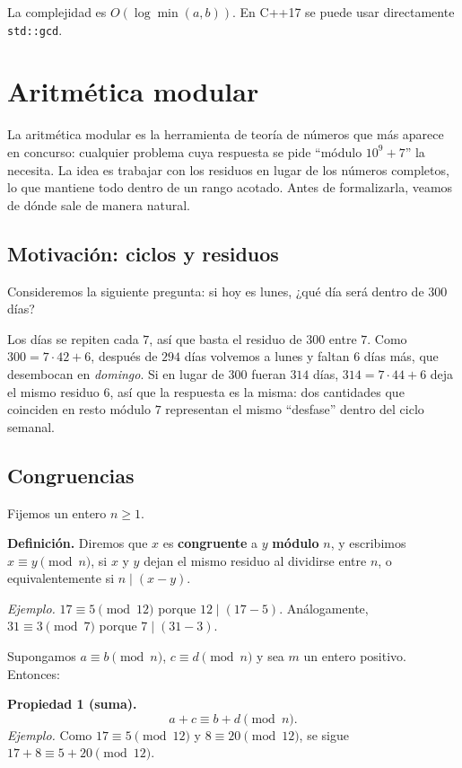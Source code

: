 La complejidad es $O(\log \min(a,b))$. En C++17 se puede usar directamente \texttt{std::gcd}.

\section{Aritmética modular}

La aritmética modular es la herramienta de teoría de números que más aparece en concurso: cualquier problema cuya respuesta se pide ``módulo $10^9+7$'' la necesita. La idea es trabajar con los residuos en lugar de los números completos, lo que mantiene todo dentro de un rango acotado. Antes de formalizarla, veamos de dónde sale de manera natural.

\subsection*{Motivación: ciclos y residuos}

Consideremos la siguiente pregunta: si hoy es lunes, ¿qué día será dentro de $300$ días?

Los días se repiten cada $7$, así que basta el residuo de $300$ entre $7$. Como $300 = 7\cdot 42 + 6$, después de $294$ días volvemos a lunes y faltan $6$ días más, que desembocan en \emph{domingo}. Si en lugar de $300$ fueran $314$ días, $314 = 7\cdot 44 + 6$ deja el mismo residuo $6$, así que la respuesta es la misma: dos cantidades que coinciden en resto módulo $7$ representan el mismo ``desfase'' dentro del ciclo semanal.

\subsection*{Congruencias}

Fijemos un entero $n \ge 1$.

\textbf{Definición.} Diremos que $x$ es \textbf{congruente} a $y$ \textbf{módulo} $n$, y escribimos $x \equiv y \pmod{n}$, si $x$ y $y$ dejan el mismo residuo al dividirse entre $n$, o equivalentemente si $n \mid (x-y)$.

\textit{Ejemplo.} $17 \equiv 5 \pmod{12}$ porque $12 \mid (17-5)$. Análogamente, $31 \equiv 3 \pmod{7}$ porque $7 \mid (31-3)$.

Supongamos $a \equiv b \pmod{n}$, $c \equiv d \pmod{n}$ y sea $m$ un entero positivo. Entonces:

\textbf{Propiedad 1 (suma).}
\[
a+c \equiv b+d \pmod{n}.
\]
\textit{Ejemplo.} Como $17 \equiv 5 \pmod{12}$ y $8 \equiv 20 \pmod{12}$, se sigue $17 + 8 \equiv 5 + 20 \pmod{12}$.

